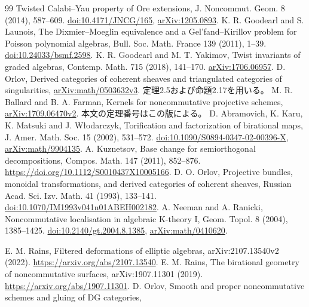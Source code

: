 \documentclass[11pt,a4paper]{ltjsarticle}
\theoremstyle{definition}
\begin{document}
\begin{thebibliography}{99}
Twisted Calabi--Yau property of Ore extensions,
J. Noncommut. Geom. 8 (2014), 587--609.
\href{https://doi.org/10.4171/JNCG/165}{doi:10.4171/JNCG/165},
\href{https://arxiv.org/abs/1205.0893}{arXiv:1205.0893}.
 K. R. Goodearl and S. Launois,
The Dixmier--Moeglin equivalence and a Gel'fand--Kirillov problem for Poisson polynomial algebras,
Bull. Soc. Math. France 139 (2011), 1--39.
\href{https://doi.org/10.24033/bsmf.2598}{doi:10.24033/bsmf.2598}.
 K. R. Goodearl and M. T. Yakimov,
Twist invariants of graded algebras, Contemp. Math. 715 (2018), 141--170.
\href{https://arxiv.org/abs/1706.06957}{arXiv:1706.06957}.
 D. Orlov,
Derived categories of coherent sheaves and triangulated categories of singularities,
\href{https://arxiv.org/abs/math/0503632}{arXiv:math/0503632v3}.
定理2.5および命題2.17を用いる。
 M. R. Ballard and B. A. Farman,
Kernels for noncommutative projective schemes,
\href{https://arxiv.org/abs/1709.06470v2}{arXiv:1709.06470v2}.
本文の定理番号はこの版による。
 D. Abramovich, K. Karu, K. Matsuki and J. W{\l}odarczyk,
Torification and factorization of birational maps,
J. Amer. Math. Soc. 15 (2002), 531--572.
\href{https://doi.org/10.1090/S0894-0347-02-00396-X}{doi:10.1090/S0894-0347-02-00396-X},
\href{https://arxiv.org/abs/math/9904135}{arXiv:math/9904135}.
 A. Kuznetsov,
Base change for semiorthogonal decompositions,
Compos. Math. 147 (2011), 852--876.
\url{https://doi.org/10.1112/S0010437X10005166}.
 D. O. Orlov,
Projective bundles, monoidal transformations, and derived categories of coherent sheaves,
Russian Acad. Sci. Izv. Math. 41 (1993), 133--141.
\href{https://doi.org/10.1070/IM1993v041n01ABEH002182}{doi:10.1070/IM1993v041n01ABEH002182}.
 A. Neeman and A. Ranicki,
Noncommutative localisation in algebraic K-theory I,
Geom. Topol. 8 (2004), 1385--1425.
\href{https://doi.org/10.2140/gt.2004.8.1385}{doi:10.2140/gt.2004.8.1385},
\href{https://arxiv.org/abs/math/0410620}{arXiv:math/0410620}.



 E. M. Rains,
Filtered deformations of elliptic algebras,
arXiv:2107.13540v2 (2022).
\url{https://arxiv.org/abs/2107.13540}.
 E. M. Rains,
The birational geometry of noncommutative surfaces,
arXiv:1907.11301 (2019).
\url{https://arxiv.org/abs/1907.11301}.
 D. Orlov,
Smooth and proper noncommutative schemes and gluing of DG categories,

\end{thebibliography}
\end{document}
